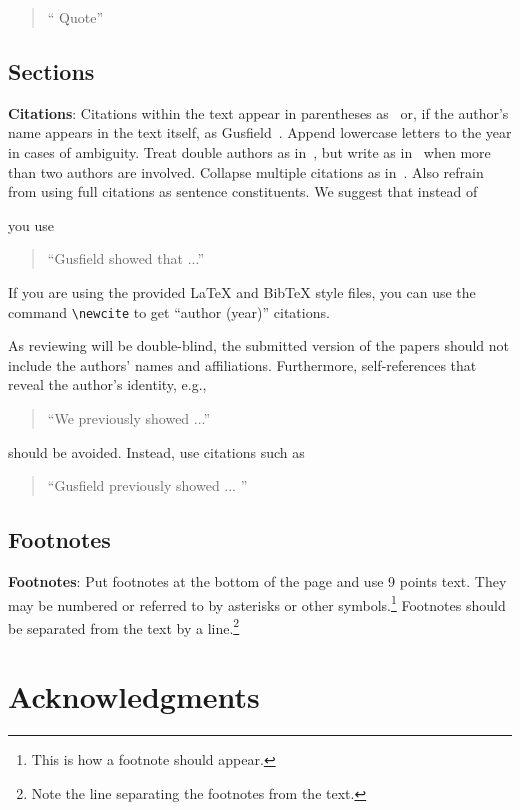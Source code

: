\documentclass[11pt]{article}
\begin{document}
\begin{quote}
  ``\cite{Graves:08} Quote''
\end{quote}

\subsection{Sections}

{\bf Citations}: Citations within the text appear in parentheses
as~\cite{Gusfield:97} or, if the author's name appears in the text
itself, as Gusfield~.  Append lowercase letters
to the year in cases of ambiguity.  Treat double authors as
in~\cite{Aho:72}, but write as in~\cite{Chandra:81} when more than two
authors are involved. Collapse multiple citations as
in~\cite{Gusfield:97,Aho:72}. Also refrain from using full citations
as sentence constituents. We suggest that instead of

you use
\begin{quote}
``Gusfield    showed that ...''
\end{quote}

If you are using the provided \LaTeX{} and Bib\TeX{} style files, you
can use the command \verb|\newcite| to get ``author (year)'' citations.

As reviewing will be double-blind, the submitted version of the papers
should not include the authors' names and affiliations. Furthermore,
self-references that reveal the author's identity, e.g.,
\begin{quote}
``We previously showed \cite{Gusfield:97} ...''  
\end{quote}
should be avoided. Instead, use citations such as 
\begin{quote}
``Gusfield 
previously showed ... ''
\end{quote}

\subsection{Footnotes}

{\bf Footnotes}: Put footnotes at the bottom of the page and use 9
points text. They may be numbered or referred to by asterisks or other
symbols.\footnote{This is how a footnote should appear.} Footnotes
should be separated from the text by a line.\footnote{Note the line
separating the footnotes from the text.}


\section*{Acknowledgments}
\end{document}
